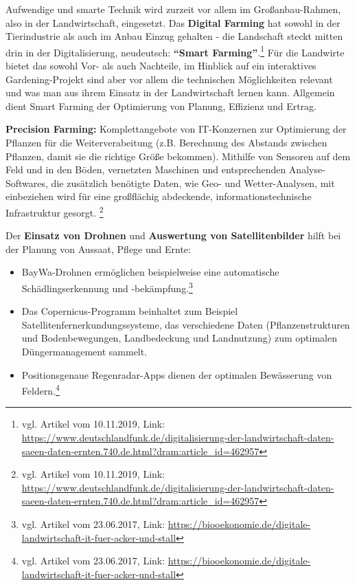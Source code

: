 Aufwendige und smarte Technik wird zurzeit vor allem im
Großanbau-Rahmen, also in der Landwirtschaft, eingesetzt. Das
\textbf{Digital Farming} hat sowohl in der Tierindustrie als auch im
Anbau Einzug gehalten - die Landschaft steckt mitten drin in der
Digitalisierung, neudeutsch: \textbf{``Smart Farming''}.\footnote{vgl.
  Artikel vom 10.11.2019, Link:
  \url{https://www.deutschlandfunk.de/digitalisierung-der-landwirtschaft-daten-saeen-daten-ernten.740.de.html?dram:article_id=462957}}
Für die Landwirte bietet das sowohl Vor- als auch Nachteile, im Hinblick
auf ein interaktives Gardening-Projekt sind aber vor allem die
technischen Möglichkeiten relevant und was man aus ihrem Einsatz in der
Landwirtschaft lernen kann. Allgemein dient Smart Farming der
Optimierung von Planung, Effizienz und Ertrag.

\textbf{Precision Farming:} Komplettangebote von IT-Konzernen zur
Optimierung der Pflanzen für die Weiterverabeitung (z.B. Berechnung des
Abstands zwischen Pflanzen, damit sie die richtige Größe bekommen).
Mithilfe von Sensoren auf dem Feld und in den Böden, vernetzten
Maschinen und entsprechenden Analyse-Softwares, die zusätzlich benötigte
Daten, wie Geo- und Wetter-Analysen, mit einbeziehen wird für eine
großflächig abdeckende, informationstechnische Infrastruktur gesorgt.
\footnote{vgl. Artikel vom 10.11.2019, Link:
  \url{https://www.deutschlandfunk.de/digitalisierung-der-landwirtschaft-daten-saeen-daten-ernten.740.de.html?dram:article_id=462957}}

Der \textbf{Einsatz von Drohnen} und \textbf{Auswertung von
Satellitenbilder} hilft bei der Planung von Aussaat, Pflege und Ernte:

\begin{itemize}
\tightlist
\item
  BayWa-Drohnen ermöglichen beispielweise eine automatische
  Schädlingserkennung und -bekämpfung.\footnote{vgl. Artikel vom
    23.06.2017, Link:
    \url{https://biooekonomie.de/digitale-landwirtschaft-it-fuer-acker-und-stall}}
\item
  Das Copernicus-Programm beinhaltet zum Beispiel
  Satellitenfernerkundungssysteme, das verschiedene Daten
  (Pflanzenstrukturen und Bodenbewegungen, Landbedeckung und
  Landnutzung) zum optimalen Düngermanagement sammelt.
\item
  Positionsgenaue Regenradar-Apps dienen der optimalen Bewässerung von
  Feldern.\footnote{vgl. Artikel vom 23.06.2017, Link:
    \url{https://biooekonomie.de/digitale-landwirtschaft-it-fuer-acker-und-stall}}
\end{itemize}

